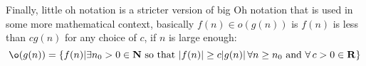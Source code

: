 \documentclass[11pt,a4paper]{scrartcl}
\begin{document}
Finally, little oh notation is a stricter version of big Oh notation
that is used in some more mathematical context, basically $f(n)\in
o(g(n))$ is $f(n)$ is less than $cg(n)$ for any choice of $c$, if $n$
is large enough:
\begin{equation}
\o(g(n))=\{f(n)| \exists n_0>0\in {\bf N}\mbox{ so that }|f(n)|\ge
c|g(n)|\,\forall n\ge n_0 \mbox{ and }\forall\,c>0\in {\bf R}\}
\end{equation}
\end{document}
